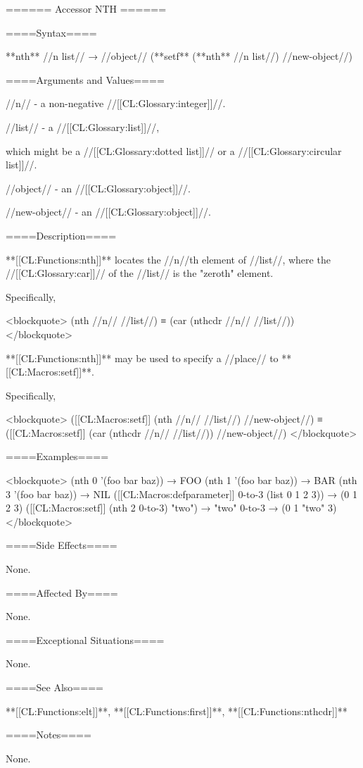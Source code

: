 ====== Accessor NTH ======

====Syntax====

**nth** //n list// → //object// (**setf** (**nth** //n list//) //new-object//)

====Arguments and Values====

//n// - a non-negative //[[CL:Glossary:integer]]//.

//list// - a //[[CL:Glossary:list]]//,

which might be a //[[CL:Glossary:dotted list]]// or a //[[CL:Glossary:circular list]]//.

//object// - an //[[CL:Glossary:object]]//.

//new-object// - an //[[CL:Glossary:object]]//.

====Description====

**[[CL:Functions:nth]]** locates the //n//th element of //list//, where the //[[CL:Glossary:car]]// of the //list// is the "zeroth" element.

Specifically,

<blockquote> (nth //n// //list//) ≡ (car (nthcdr //n// //list//)) </blockquote>

**[[CL:Functions:nth]]** may be used to specify a //place// to **[[CL:Macros:setf]]**.

Specifically,

<blockquote> ([[CL:Macros:setf]] (nth //n// //list//) //new-object//) ≡ ([[CL:Macros:setf]] (car (nthcdr //n// //list//)) //new-object//) </blockquote>

====Examples====

<blockquote> (nth 0 '(foo bar baz)) → FOO (nth 1 '(foo bar baz)) → BAR (nth 3 '(foo bar baz)) → NIL ([[CL:Macros:defparameter]] 0-to-3 (list 0 1 2 3)) → (0 1 2 3) ([[CL:Macros:setf]] (nth 2 0-to-3) "two") → "two" 0-to-3 → (0 1 "two" 3) </blockquote>

====Side Effects====

None.

====Affected By====

None.

====Exceptional Situations====

None.

====See Also====

**[[CL:Functions:elt]]**, **[[CL:Functions:first]]**, **[[CL:Functions:nthcdr]]**

====Notes====

None.

  
